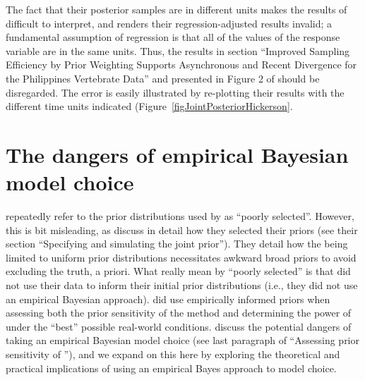 \documentclass[letterpaper,12pt]{article}
\begin{document}
\begin{linenumbers}
The fact that their posterior samples are in different units makes the results
of \citet{Hickerson2013} difficult to interpret, and renders their
regression-adjusted results invalid; a fundamental assumption of regression is
that all of the values of the response variable are in the same units.
Thus, the results in section ``Improved Sampling Efficiency by Prior Weighting
Supports Asynchronous and Recent Divergence for the Philippines Vertebrate
Data'' and presented in Figure 2 of \citet{Hickerson2013} should be
disregarded.
The error is easily illustrated by re-plotting their results with the different
time units indicated (Figure~\ref{figJointPosteriorHickerson}.



\section*{The dangers of empirical Bayesian model choice}
\citet{Hickerson2013} repeatedly refer to the prior distributions used by
\citet{Oaks2012} as ``poorly selected''.
However, this is bit misleading, as \citet{Oaks2012} discuss in detail how they
selected their priors (see their section ``Specifying and simulating the joint
prior'').
They detail how the being limited to uniform prior distributions necessitates
awkward broad priors to avoid excluding the truth, a priori.
What \citet{Hickerson2013} really mean by ``poorly selected'' is that
\citet{Oaks2012} did not use their data to inform their initial prior
distributions (i.e., they did not use an empirical Bayesian approach).
\citet{Oaks2012} did use empirically informed priors when assessing
both the prior sensitivity of the method and determining the power of \msb
under the ``best'' possible real-world conditions.
\citet{Oaks2012} discuss the potential dangers of taking an empirical Bayesian
model choice (see last paragraph of ``Assessing prior sensitivity of \msb''),
and we expand on this here by exploring the theoretical and practical
implications of using an empirical Bayes approach to model choice.


\end{linenumbers}
\end{document}
